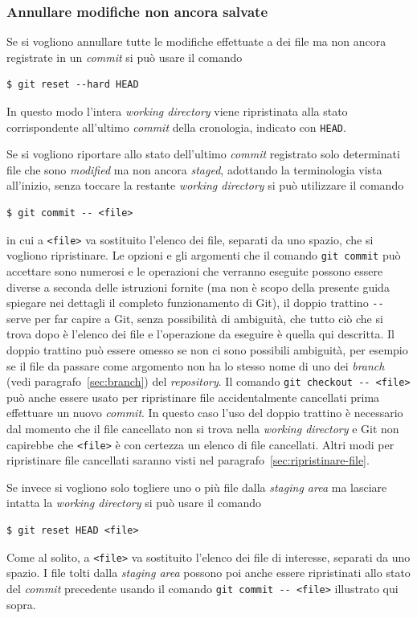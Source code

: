\documentclass[a4paper,12pt,oneside]{article}
\begin{document}
\subsubsection{Annullare modifiche non ancora salvate}
\label{sec:annullare-modifiche-non-salvate}

Se si vogliono annullare tutte le modifiche effettuate a dei file ma non ancora
registrate in un \emph{commit} si può usare il comando
\begin{lstlisting}
$ git reset --hard HEAD
\end{lstlisting}
In questo modo l'intera \emph{working directory} viene ripristinata alla stato
corrispondente all'ultimo \emph{commit} della cronologia, indicato con
\lstinline|HEAD|.

Se si vogliono riportare allo stato dell'ultimo \emph{commit} registrato solo
determinati file che sono \emph{modified} ma non ancora \emph{staged}, adottando
la terminologia vista all'inizio, senza toccare la restante
\emph{working directory} si può utilizzare il comando
\begin{lstlisting}
$ git commit -- <file>
\end{lstlisting}
in cui a \lstinline|<file>| va sostituito l'elenco dei file, separati da uno
spazio, che si vogliono ripristinare. Le opzioni e gli argomenti che il comando
\lstinline|git commit| può accettare sono numerosi e le operazioni che verranno
eseguite possono essere diverse a seconda delle istruzioni fornite (ma non è
scopo della presente guida spiegare nei dettagli il completo funzionamento di
Git), il doppio trattino \lstinline|--| serve per far capire a Git, senza
possibilità di ambiguità, che tutto ciò che si trova dopo è l'elenco dei file e
l'operazione da eseguire è quella qui descritta. Il doppio trattino può essere
omesso se non ci sono possibili ambiguità, per esempio se il file da passare
come argomento non ha lo stesso nome di uno dei \emph{branch} (vedi
paragrafo~\ref{sec:branch}) del \emph{repository}. Il comando
\lstinline|git checkout -- <file>| può anche essere usato per ripristinare file
accidentalmente cancellati prima effettuare un nuovo \emph{commit}. In questo
caso l'uso del doppio trattino è necessario dal momento che il file cancellato
non si trova nella \emph{working directory} e Git non capirebbe che
\lstinline|<file>| è con certezza un elenco di file cancellati. Altri modi per
ripristinare file cancellati saranno visti nel
paragrafo~\ref{sec:ripristinare-file}.

Se invece si vogliono solo togliere uno o più file dalla \emph{staging area} ma
lasciare intatta la \emph{working directory} si può usare il comando
\begin{lstlisting}
$ git reset HEAD <file>
\end{lstlisting}
Come al solito, a \lstinline|<file>| va sostituito l'elenco dei file di
interesse, separati da uno spazio. I file tolti dalla \emph{staging area}
possono poi anche essere ripristinati allo stato del \emph{commit} precedente
usando il comando \lstinline|git commit -- <file>| illustrato qui sopra.
\end{document}

